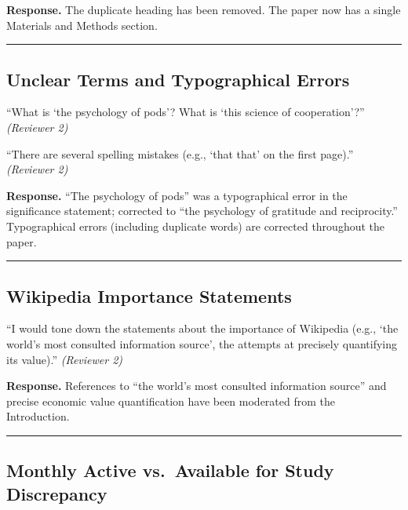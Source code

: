 \documentclass[12pt]{article}
\newenvironment{reviewquote}{%
  \def\FrameCommand{{\color{quotebarcolor}\vrule width 2pt}\colorbox{quotebg}}%
  \MakeFramed{\advance\hsize-\width \FrameRestore}%
  \small
}{%
  \endMakeFramed
}
\begin{document}
\textbf{Response.} The duplicate heading has been removed. The paper now has a single Materials and Methods section.

\bigskip\hrule\bigskip

\subsection{Unclear Terms and Typographical Errors}

\begin{reviewquote}
``What is `the psychology of pods'? What is `this science of cooperation'?'' \textit{(Reviewer 2)}
\end{reviewquote}

\begin{reviewquote}
``There are several spelling mistakes (e.g., `that that' on the first page).'' \textit{(Reviewer 2)}
\end{reviewquote}

\textbf{Response.} ``The psychology of pods'' was a typographical error in the significance statement; corrected to ``the psychology of gratitude and reciprocity.'' Typographical errors (including duplicate words) are corrected throughout the paper.

\bigskip\hrule\bigskip

\subsection{Wikipedia Importance Statements}

\begin{reviewquote}
``I would tone down the statements about the importance of Wikipedia (e.g., `the world's most consulted information source', the attempts at precisely quantifying its value).'' \textit{(Reviewer 2)}
\end{reviewquote}

\textbf{Response.} References to ``the world's most consulted information source'' and precise economic value quantification have been moderated from the Introduction.

\bigskip\hrule\bigskip

\subsection{Monthly Active vs.\ Available for Study Discrepancy}
\end{document}
